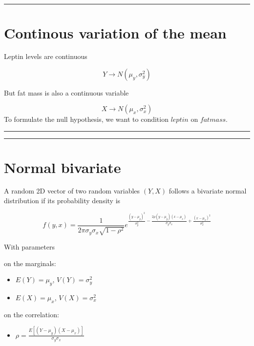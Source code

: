 \documentclass[
]{book}
\providecommand{\tightlist}{%
  \setlength{\itemsep}{0pt}\setlength{\parskip}{0pt}}
\begin{document}
\begin{center}\rule{0.5\linewidth}{0.5pt}\end{center}

\hypertarget{continous-variation-of-the-mean}{%
\section{Continous variation of the mean}\label{continous-variation-of-the-mean}}

Leptin levels are continuous

\[Y \rightarrow N(\mu_y, \sigma_{y}^2)\]

But fat mass is also a continuous variable

\[X \rightarrow N(\mu_x, \sigma_x^2)\]
To formulate the null hypothesis, we want to condition \(leptin\) on \(fatmass\).

\begin{center}\rule{0.5\linewidth}{0.5pt}\end{center}

\begin{center}\rule{0.5\linewidth}{0.5pt}\end{center}

\hypertarget{normal-bivariate}{%
\section{Normal bivariate}\label{normal-bivariate}}

A random 2D vector of two random variables \((Y, X)\) follows a bivariate normal distribution if its probability density is

\[f(y,x)=\frac{1}{2\pi \sigma_y\sigma_x \sqrt{1-\rho^2}}e^{\frac{(y-\mu_y)^2}{\sigma_y^2}-\frac{2\rho(y-\mu_y)(x-\mu_x)}{\sigma_y\sigma_x}+\frac{(x-\mu_x)^2}{\sigma_x^2}}\]

With parameters

on the marginals:

\begin{itemize}
\tightlist
\item
  \(E(Y)=\mu_y\), \(V(Y)=\sigma^2_y\)
\item
  \(E(X)=\mu_x\), \(V(X)=\sigma^2_x\)
\end{itemize}

on the correlation:

\begin{itemize}
\tightlist
\item
  \(\rho= \frac{E[(Y-\mu_y)(X-\mu_x)]}{\sigma_y\sigma_x}\)
\end{itemize}
\end{document}

